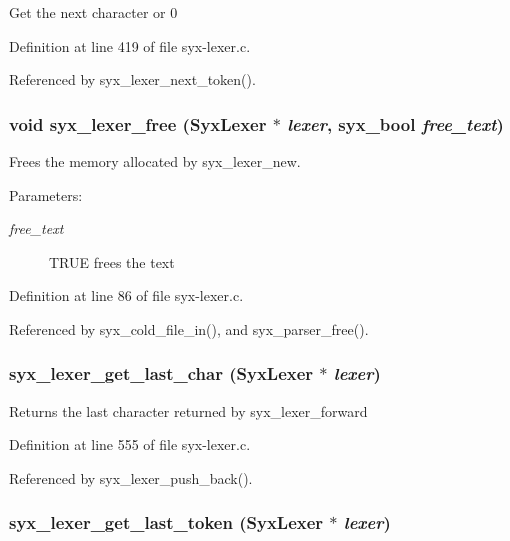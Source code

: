 Get the next character or 0 

Definition at line 419 of file syx-lexer.c.

Referenced by syx\_\-lexer\_\-next\_\-token().\hypertarget{syx-lexer_8c_d89a4d0325732438808e9777acd52668}{
\subsubsection{\setlength{\rightskip}{0pt plus 5cm}void syx\_\-lexer\_\-free ({\bf SyxLexer} $\ast$ {\em lexer}, \/  {\bf syx\_\-bool} {\em free\_\-text})}}
\label{syx-lexer_8c_d89a4d0325732438808e9777acd52668}


Frees the memory allocated by syx\_\-lexer\_\-new.

\begin{Desc}
\item[Parameters:]
\begin{description}
\item[{\em free\_\-text}]TRUE frees the text \end{description}
\end{Desc}


Definition at line 86 of file syx-lexer.c.

Referenced by syx\_\-cold\_\-file\_\-in(), and syx\_\-parser\_\-free().\hypertarget{syx-lexer_8c_ee55d47dda81e68468848c74abfa90eb}{
\subsubsection{ syx\_\-lexer\_\-get\_\-last\_\-char ({\bf SyxLexer} $\ast$ {\em lexer})}}
\label{syx-lexer_8c_ee55d47dda81e68468848c74abfa90eb}


Returns the last character returned by syx\_\-lexer\_\-forward 

Definition at line 555 of file syx-lexer.c.

Referenced by syx\_\-lexer\_\-push\_\-back().\hypertarget{syx-lexer_8c_60d30b9d8152c9caa210c1bdeba9b689}{
\subsubsection{ syx\_\-lexer\_\-get\_\-last\_\-token ({\bf SyxLexer} $\ast$ {\em lexer})}}
\label{syx-lexer_8c_60d30b9d8152c9caa210c1bdeba9b689}


